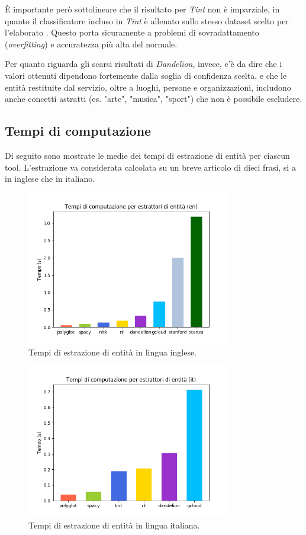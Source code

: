\documentclass[a4paper,11pt]{article}
\begin{document}
È importante però sottolineare che il risultato per \textit{Tint} non è imparziale, in quanto il classificatore incluso in \textit{Tint} è allenato sullo stesso dataset scelto per l'elaborato \cite{dataset-it}. Questo porta sicuramente a problemi di sovradattamento (\textit{overfitting}) e accuratezza più alta del normale.

Per quanto riguarda gli scarsi risultati di \textit{Dandelion}, invece, c'è da dire che i valori ottenuti dipendono fortemente dalla soglia di confidenza scelta, e che le entità restituite dal servizio, oltre a luoghi, persone e organizzazioni, includono anche concetti astratti (es. "arte", "musica", "sport") che non è possibile escludere.

\subsection{Tempi di computazione}
\label{results-times}
Di seguito sono mostrate le medie dei tempi di estrazione di entità per ciascun tool. L'estrazione va considerata calcolata su un breve articolo di dieci frasi, si a in inglese che in italiano.
\begin{figure}[H]
\centering
\includegraphics[width=0.8\textwidth]{img/time-en}
\vspace*{-5mm}
\caption{Tempi di estrazione di entità in lingua inglese.}
\label{fig:time-en}
\end{figure}

\begin{figure}[H]
\centering
\includegraphics[width=0.8\textwidth]{img/time-it}
\vspace*{-5mm}
\caption{Tempi di estrazione di entità in lingua italiana.}
\label{fig:time-it}
\end{figure}
\end{document}
